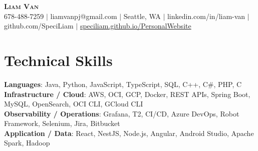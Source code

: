 \documentclass[letterpaper,11pt]{article}
\begin{document}

%
\begin{center}
    \textbf{\Huge \scshape Liam Van} \\ \vspace{1pt}
    \small 678-488-7259 $|$ \small {liamvanpj@gmail.com} $|$ Seattle, WA
 {{$|$ linkedin.com/in/liam-van} {$|$ github.com/SpeciLiam} {$|$ \href{https://speciliam.github.io/PersonalWebsite}{speciliam.github.io/PersonalWebsite}}}

\end{center}

\section{Technical Skills}
 \begin{itemize}[leftmargin=0.15in, label={}]
    \small{\item{
     \textbf{Languages}{: Java, Python, JavaScript, TypeScript, SQL, C++, C\#, PHP, C} \\
     \textbf{Infrastructure / Cloud}{: AWS, OCI, GCP, Docker, REST APIs, Spring Boot, MySQL, OpenSearch, OCI CLI, GCloud CLI} \\
     \textbf{Observability / Operations}{: Grafana, T2, CI/CD, Azure DevOps, Robot Framework, Selenium, Jira, Bitbucket} \\
     \textbf{Application / Data}{: React, NestJS, Node.js, Angular, Android Studio, Apache Spark, Hadoop} \\
    }}
 \end{itemize}
%
\end{document}
